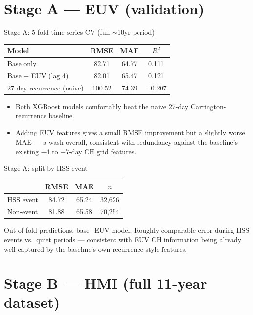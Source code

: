 \documentclass[11pt]{beamer}
\begin{document}
\section{Stage A --- EUV (validation)}

\begin{frame}{Stage A: 5-fold time-series CV (full $\sim$10yr period)}
\begin{table}
\centering
\begin{tabular}{lccc}
\toprule
Model & RMSE & MAE & $R^2$ \\
\midrule
Base only & 82.71 & 64.77 & 0.111 \\
Base + EUV (lag 4) & 82.01 & 65.47 & 0.121 \\
27-day recurrence (naive) & 100.52 & 74.39 & $-0.207$ \\
\bottomrule
\end{tabular}
\end{table}

\begin{itemize}
  \item Both XGBoost models comfortably beat the naive 27-day Carrington-recurrence baseline.
  \item Adding EUV features gives a small RMSE improvement but a slightly worse MAE --- a wash overall, consistent with redundancy against the baseline's existing $-4$ to $-7$-day CH grid features.
\end{itemize}
\end{frame}

\begin{frame}{Stage A: split by HSS event}
\begin{table}
\centering
\begin{tabular}{lccc}
\toprule
& RMSE & MAE & $n$ \\
\midrule
HSS event & 84.72 & 65.24 & 32{,}626 \\
Non-event & 81.88 & 65.58 & 70{,}254 \\
\bottomrule
\end{tabular}
\end{table}
Out-of-fold predictions, base+EUV model. Roughly comparable error during HSS events vs.\ quiet periods --- consistent with EUV CH information being already well captured by the baseline's own recurrence-style features.
\end{frame}

\section{Stage B --- HMI (full 11-year dataset)}
\end{document}
